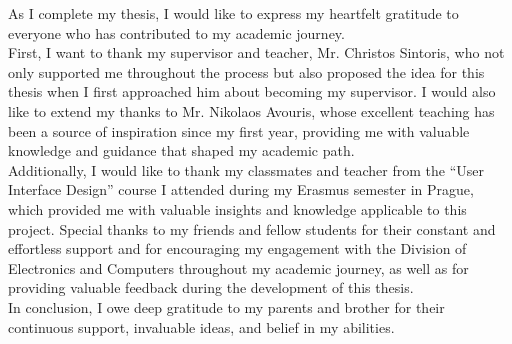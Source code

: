 \thispagestyle{empty}
\vspace*{2cm}

\vspace{5mm}

\noindent As I complete my thesis, I would like to express my heartfelt gratitude to everyone who has contributed to my academic journey.\vspace{3mm} \\
First, I want to thank my supervisor and teacher, Mr. Christos Sintoris, who not only supported me throughout the process but also proposed the idea for this thesis when I first approached him about becoming my supervisor. I would also like to extend my thanks to Mr. Nikolaos Avouris, whose excellent teaching has been a source of inspiration since my first year, providing me with valuable knowledge and guidance that shaped my academic path.\vspace{3mm} \\
Additionally, I would like to thank my classmates and teacher from the ``User Interface Design'' course I attended during my Erasmus semester in Prague, which provided me with valuable insights and knowledge applicable to this project. Special thanks to my friends and fellow students for their constant and effortless support and for encouraging my engagement with the Division of Electronics and Computers throughout my academic journey, as well as for providing valuable feedback during the development of this thesis.\vspace{3mm} \\
In conclusion, I owe deep gratitude to my parents and brother for their continuous support, invaluable ideas, and belief in my abilities.

\clearpage
\myemptypage
\thispagestyle{empty}

\vspace*{2cm}

\vspace{5mm}

